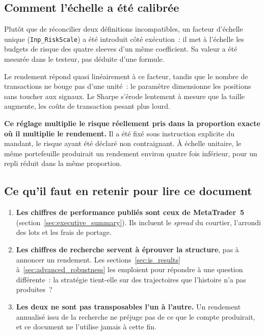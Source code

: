 \subsection{Comment l'échelle a été calibrée}

Plutôt que de réconcilier deux définitions incompatibles, un facteur d'échelle unique (\texttt{Inp\_RiskScale}) a été introduit côté exécution~: il met à l'échelle les budgets de risque des quatre sleeves d'un même coefficient. Sa valeur a été mesurée dans le testeur, pas déduite d'une formule.

Le rendement répond quasi linéairement à ce facteur, tandis que le nombre de transactions ne bouge pas d'une unité~: le paramètre dimensionne les positions sans toucher aux signaux. Le Sharpe s'érode lentement à mesure que la taille augmente, les coûts de transaction pesant plus lourd.

\begin{warningbox}
\textbf{Ce réglage multiplie le risque réellement pris dans la proportion exacte où il multiplie le rendement.} Il a été fixé sous instruction explicite du mandant, le risque ayant été déclaré non contraignant. À échelle unitaire, le même portefeuille produirait un rendement environ quatre fois inférieur, pour un repli réduit dans la même proportion.
\end{warningbox}

\subsection{Ce qu'il faut en retenir pour lire ce document}

\begin{enumerate}
\item \textbf{Les chiffres de performance publiés sont ceux de MetaTrader~5} (section~\ref{sec:executive_summary}). Ils incluent le \emph{spread} du courtier, l'arrondi des lots et les frais de portage.
\item \textbf{Les chiffres de recherche servent à éprouver la structure}, pas à annoncer un rendement. Les sections~\ref{sec:is_results} à~\ref{sec:advanced_robustness} les emploient pour répondre à une question différente~: la stratégie tient-elle sur des trajectoires que l'histoire n'a pas produites~?
\item \textbf{Les deux ne sont pas transposables l'un à l'autre.} Un rendement annualisé issu de la recherche ne préjuge pas de ce que le compte produirait, et ce document ne l'utilise jamais à cette fin.
\end{enumerate}
